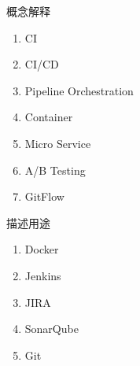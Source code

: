 \begin{problem}
概念解释
\vspace{-0.8em}
\begin{multicols}{3}
    \begin{enumerate}[label=\arabic*.]
        \item CI
        \item CI/CD
        \item Pipeline Orchestration
        \item Container
        \item Micro Service
        \item A/B Testing
        \item GitFlow
    \end{enumerate}
\end{multicols}
\vspace{-1em}
\end{problem}

\begin{problem}
描述用途
\vspace{-0.8em}
\begin{multicols}{5}
    \begin{enumerate}[label=\arabic*.]
        \item Docker
        \item Jenkins
        \item JIRA
        \item SonarQube
        \item Git
    \end{enumerate}
\end{multicols}
\vspace{-1em}
\end{problem}